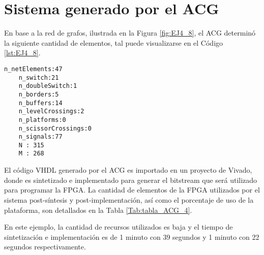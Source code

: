 \section{Sistema generado por el ACG}
	
	En base a la red de grafos, ilustrada en la Figura \ref{fig:EJ4_8}, el ACG determinó la siguiente cantidad de elementos, tal puede visualizarse en el Código \ref{lst:EJ4_8}.

	\begin{lstlisting}[language = {}, caption = Cantidad de elementos a implementar por el ACG, label = {lst:EJ4_8}]
	n_netElements:47
	n_switch:21
	n_doubleSwitch:1
	n_borders:5
	n_buffers:14
	n_levelCrossings:2
	n_platforms:0
	n_scissorCrossings:0
	n_signals:77
	N : 315
	M : 268
	\end{lstlisting}

	El código VHDL generado por el ACG es importado en un proyecto de Vivado, donde es sintetizado e implementado para generar el bitstream que será utilizado para programar la FPGA. La cantidad de elementos de la FPGA utilizados por el sistema post-síntesis y post-implementación, así como el porcentaje de uso de la plataforma, son detallados en la Tabla \ref{Tab:tabla_ACG_4}.
	
	\begin{table}[H]
		{
			\caption{Síntesis e implementación del ejemplo 4 generado por el ACG.}
			\label{Tab:tabla_ACG_4}
			\centering
			\begin{center}
			\end{center}
		}    
	\end{table}
	
	En este ejemplo, la cantidad de recursos utilizados es baja y el tiempo de sintetización e implementación es de 1 minuto con 39 segundos y 1 minuto con 22 segundos respectivamente.